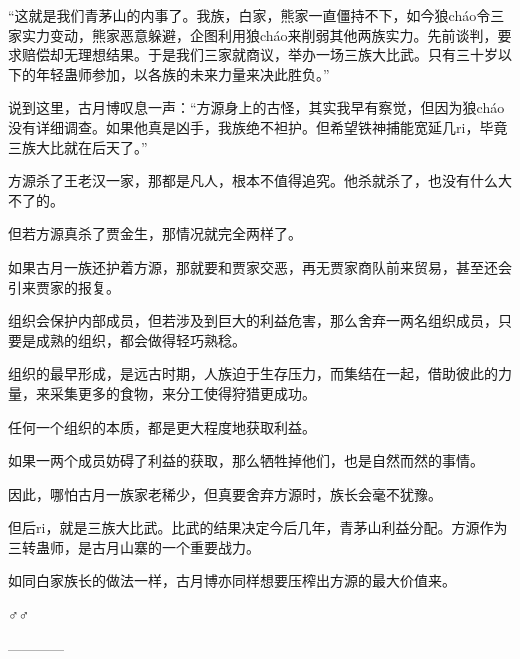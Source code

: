 \begin{this_body}
“这就是我们青茅山的内事了。我族，白家，熊家一直僵持不下，如今狼cháo令三家实力变动，熊家恶意躲避，企图利用狼cháo来削弱其他两族实力。先前谈判，要求赔偿却无理想结果。于是我们三家就商议，举办一场三族大比武。只有三十岁以下的年轻蛊师参加，以各族的未来力量来决此胜负。”

说到这里，古月博叹息一声：“方源身上的古怪，其实我早有察觉，但因为狼cháo没有详细调查。如果他真是凶手，我族绝不袒护。但希望铁神捕能宽延几ri，毕竟三族大比就在后天了。”

方源杀了王老汉一家，那都是凡人，根本不值得追究。他杀就杀了，也没有什么大不了的。

但若方源真杀了贾金生，那情况就完全两样了。

如果古月一族还护着方源，那就要和贾家交恶，再无贾家商队前来贸易，甚至还会引来贾家的报复。

组织会保护内部成员，但若涉及到巨大的利益危害，那么舍弃一两名组织成员，只要是成熟的组织，都会做得轻巧熟稔。

组织的最早形成，是远古时期，人族迫于生存压力，而集结在一起，借助彼此的力量，来采集更多的食物，来分工使得狩猎更成功。

任何一个组织的本质，都是更大程度地获取利益。

如果一两个成员妨碍了利益的获取，那么牺牲掉他们，也是自然而然的事情。

因此，哪怕古月一族家老稀少，但真要舍弃方源时，族长会毫不犹豫。

但后ri，就是三族大比武。比武的结果决定今后几年，青茅山利益分配。方源作为三转蛊师，是古月山寨的一个重要战力。

如同白家族长的做法一样，古月博亦同样想要压榨出方源的最大价值来。

♂♂

------------

\end{this_body}

